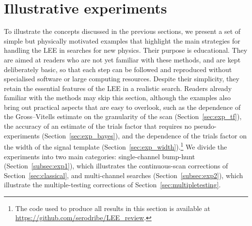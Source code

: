 \section{Illustrative experiments}\label{sec:experiments}
To illustrate the concepts discussed in the previous sections, we present a set of simple but physically motivated examples that highlight the main strategies for handling the LEE in searches for new physics.
Their purpose is educational. They are aimed at readers who are not yet familiar with these methods, and are kept deliberately basic, so that each step can be followed and reproduced without specialised software or large computing resources. Despite their simplicity, they retain the essential features of the LEE in a realistic search. Readers already familiar with the methods may skip this section, although the examples also bring out practical aspects that are easy to overlook, such as the dependence of the Gross--Vitells estimate on the granularity of the scan (Section~\ref{sec:exp_tf}), the accuracy of an estimate of the trials factor that requires no pseudo-experiments (Section~\ref{sec:exp_bayes}), and the dependence of the trials factor on the width of the signal template (Section~\ref{sec:exp_width}).\footnote{The code used to produce all results in this section is available at \url{https://github.com/serodribe/LEE_review}.}
We divide the experiments into two main categories: single-channel bump-hunt (Section~\ref{subsec:exp1}), which illustrates the continuous-scan corrections of Section~\ref{sec:classical}, and multi-channel searches (Section~\ref{subsec:exp2}), which illustrate the multiple-testing corrections of Section~\ref{sec:multipletesting}.

